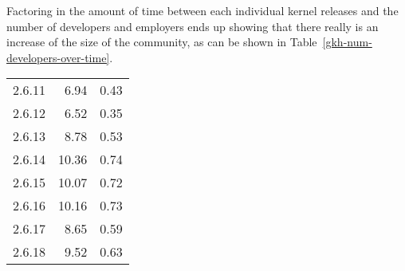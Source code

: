 \documentclass[final]{ols}
\begin{document}
Factoring in the amount of time between each individual kernel releases
and the number of developers and employers ends up showing that there
really is an increase of the size of the community, as can be shown in
Table~\ref{gkh-num-developers-over-time}.

\begin{table}%
\begin{center}
\begin{tabular}{|r|r|r|}
\hline
\multicolumn{1}{|p{1.3cm}|}{\centering{\vspace*{0.3ex}Kernel Version}}  & 
\multicolumn{1}{|p{2.0cm}|}{\centering{Number of Developers per day}}  & 
\multicolumn{1}{|p{2.0cm}|}{\centering{Number of Companies per day}} \\
\hline
\hline
\rule[-0.1ex]{0pt}{2.5ex}2.6.11	&  6.94\hspace{3ex}	& 0.43\hspace{3ex}	\\
2.6.12	&  6.52\hspace{3ex}	& 0.35\hspace{3ex}	\\
2.6.13	&  8.78\hspace{3ex}	& 0.53\hspace{3ex}	\\
2.6.14	& 10.36\hspace{3ex}	& 0.74\hspace{3ex}	\\
2.6.15	& 10.07\hspace{3ex}	& 0.72\hspace{3ex}	\\
2.6.16	& 10.16\hspace{3ex}	& 0.73\hspace{3ex}	\\
2.6.17	&  8.65\hspace{3ex}	& 0.59\hspace{3ex}	\\
2.6.18	&  9.52\hspace{3ex}	& 0.63\hspace{3ex}	\\

\end{tabular}
\end{center}
\end{table}
\end{document}
